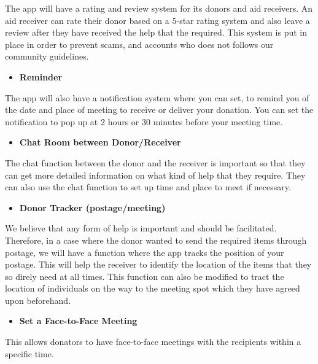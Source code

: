 \documentclass[conference]{IEEEtran}
\begin{document}
\par The app will have a rating and review system for its donors and aid receivers. An aid receiver can rate their donor based on a 5-star rating system and also leave a review after they have received the help that the required. This system is put in place in order to prevent scams, and accounts who does not follows our community guidelines.\\
\begin{itemize}
\item \textbf{Reminder}
\end{itemize}
\par The app will also have a notification system where you can set, to remind you of the date and place of meeting to receive or deliver your donation. You can set the notification to pop up at 2 hours or 30 minutes before your meeting time.\\
\begin{itemize}
\item \textbf{Chat Room between Donor/Receiver}
\end{itemize}
\par The chat function between the donor and the receiver is important so that they can get more detailed information on what kind of help that they require. They can also use the chat function to set up time and place to meet if necessary.\\
\begin{itemize}
\item \textbf{Donor Tracker (postage/meeting)}
\end{itemize}
\par We believe that any form of help is important and should be facilitated. Therefore, in a case where the donor wanted to send the required items through postage, we will have a function where the app tracks the position of your postage. This will help the receiver to identify the location of the items that they so direly need at all times. This function can also be modified to tract the location of individuals on the way to the meeting spot which they have agreed upon beforehand.\\
\begin{itemize}
\item  \textbf{Set a Face-to-Face Meeting}
\end{itemize}
\par This allows donators to have face-to-face meetings with the recipients within a specific time. 
\end{document}
